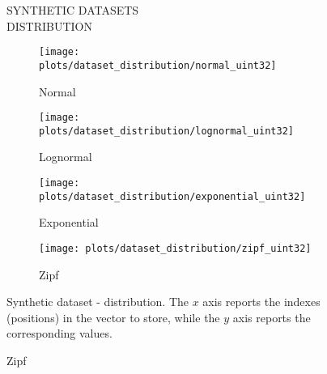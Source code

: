 \documentclass{article}
\begin{document}
\begin{figure}[!htbp]
\fbox
{
\begin{minipage}[t][0.98\textheight][t]{\textwidth}
\centering
    \vspace{20px}
    \begin{minipage}{0.95\linewidth}
    SYNTHETIC DATASETS \\ DISTRIBUTION
    \end{minipage}
    \vspace{20px}

   \begin{minipage}{0.45\linewidth}
        \begin{figure}[H]
        \texttt{[image: plots/dataset\_distribution/normal\_uint32]}
        \caption{Normal}
        \end{figure}
    \end{minipage}
    \begin{minipage}{0.45\linewidth}
        \begin{figure}[H]
            \texttt{[image: plots/dataset\_distribution/lognormal\_uint32]}
            \caption{Lognormal}
        \end{figure}
    \end{minipage}

    \vfill
    
    \begin{minipage}{0.45\linewidth}
        \begin{figure}[H]
        \texttt{[image: plots/dataset\_distribution/exponential\_uint32]}
        \caption{Exponential}
        \end{figure}
    \end{minipage}
    \begin{minipage}{0.45\linewidth}
        \begin{figure}[H]
            \texttt{[image: plots/dataset\_distribution/zipf\_uint32]}
            \caption{Zipf}
        \end{figure}
    \end{minipage}

    \vfill
    \centering
    \begin{minipage}{\linewidth}
        Synthetic dataset - distribution. The $x$ axis reports the indexes (positions) in the vector to store, while the $y$ axis reports the corresponding values.
    \end{minipage}
    \vspace{10px}
\end{minipage}
}
\end{figure}
\end{document}
